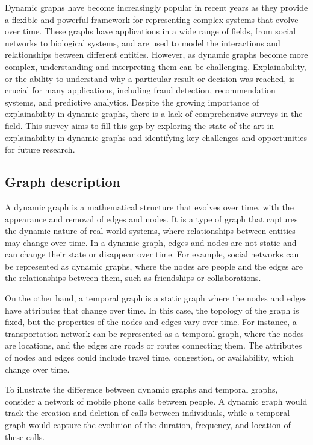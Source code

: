 
Dynamic graphs have become increasingly popular in recent years as they provide a flexible and powerful framework for representing complex systems that evolve over time. These graphs have applications in a wide range of fields, from social networks to biological systems, and are used to model the interactions and relationships between different entities. However, as dynamic graphs become more complex, understanding and interpreting them can be challenging. Explainability, or the ability to understand why a particular result or decision was reached, is crucial for many applications, including fraud detection, recommendation systems, and predictive analytics. Despite the growing importance of explainability in dynamic graphs, there is a lack of comprehensive surveys in the field. This survey aims to fill this gap by exploring the state of the art in explainability in dynamic graphs and identifying key challenges and opportunities for future research.


\subsection{Graph description}
A dynamic graph is a mathematical structure that evolves over time, with the appearance and removal of edges and nodes. It is a type of graph that captures the dynamic nature of real-world systems, where relationships between entities may change over time. In a dynamic graph, edges and nodes are not static and can change their state or disappear over time. For example, social networks can be represented as dynamic graphs, where the nodes are people and the edges are the relationships between them, such as friendships or collaborations.

On the other hand, a temporal graph is a static graph where the nodes and edges have attributes that change over time. In this case, the topology of the graph is fixed, but the properties of the nodes and edges vary over time. For instance, a transportation network can be represented as a temporal graph, where the nodes are locations, and the edges are roads or routes connecting them. The attributes of nodes and edges could include travel time, congestion, or availability, which change over time.

To illustrate the difference between dynamic graphs and temporal graphs, consider a network of mobile phone calls between people. A dynamic graph would track the creation and deletion of calls between individuals, while a temporal graph would capture the evolution of the duration, frequency, and location of these calls.

